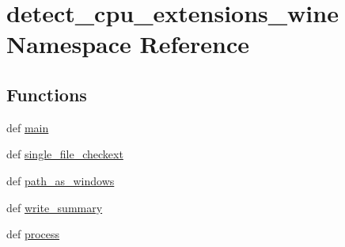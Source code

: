\hypertarget{namespacedetect__cpu__extensions__wine}{}\section{detect\+\_\+cpu\+\_\+extensions\+\_\+wine Namespace Reference}
\label{namespacedetect__cpu__extensions__wine}
\subsection*{Functions}
\begin{DoxyCompactItemize}
\item 
def \hyperlink{namespacedetect__cpu__extensions__wine_af19b30f3a55344a81d2ecfaff0ffe03c}{main}
\item 
def \hyperlink{namespacedetect__cpu__extensions__wine_ac62d8cd8699dee6119f84b4fb9062141}{single\+\_\+file\+\_\+checkext}
\item 
def \hyperlink{namespacedetect__cpu__extensions__wine_ad83e6e5ed25771d0f17eebed8251f01a}{path\+\_\+as\+\_\+windows}
\item 
def \hyperlink{namespacedetect__cpu__extensions__wine_ad0b96c2245f45130dbae7e135b744d9a}{write\+\_\+summary}
\item 
def \hyperlink{namespacedetect__cpu__extensions__wine_a8912b86440d62a20288f2de18e9866ba}{process}
\end{DoxyCompactItemize}
